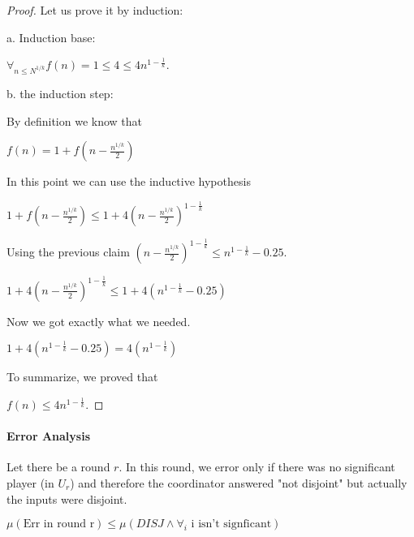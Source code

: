 \documentclass{article}
\theoremstyle{plain}
\begin{document}
\begin{proof}
Let us prove it by induction: \newline

a. Induction base: \newline

$\forall_{n \leq N^{1/k}} f(n) = 1 \leq 4 \leq 4n^{1-\frac{1}{k}}$. \newline

b. the induction step: \newline

By definition we know that \newline

$f(n) = 1 + f(n - \frac{n^{1/k}}{2})$ \newline

In this point we can use the inductive hypothesis \newline

$1 + f(n - \frac{n^{1/k}}{2}) \leq 1 + 4(n - \frac{n^{1/k}}{2})^{1-\frac{1}{k}}$ \newline

Using the previous claim $(n - \frac{n^{1/k}}{2})^{1-\frac{1}{k}} \leq n^{1-\frac{1}{k}}-0.25$. \newline

$1 + 4(n - \frac{n^{1/k}}{2})^{1-\frac{1}{k}} \leq 1 + 4(n^{1-\frac{1}{k}}-0.25)$ \newline

Now we got exactly what we needed. \newline

$1 + 4(n^{1-\frac{1}{k}}-0.25) = 4(n^{1-\frac{1}{k}})$ \newline

To summarize, we proved that \newline

$f(n) \leq 4n^{1-\frac{1}{k}}$. \newline

\end{proof}
\paragraph{Error Analysis}
Let there be a round $r$. In this round, we error only if there was no significant player (in $U_r$) and therefore the coordinator answered "not disjoint" but actually the inputs were disjoint. \newline

$\mu(\text{Err in round r}) \leq \mu(DISJ \land \forall_i \text{ i isn't signficant})$ \newline
\end{document}
